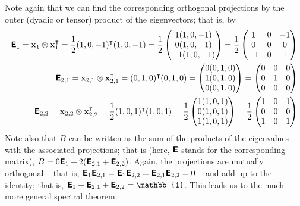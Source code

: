 {Note again that we can find the corresponding orthogonal projections by the outer (dyadic or tensor) product
of the eigenvectors; that is,  by
\begin{equation}
\begin{split}
\textsf{\textbf{E}}_1 =
{\bf x}_1 \otimes {\bf x}_1^\intercal  =
\frac{1}{2} (1,0,-1)^\intercal (1,0,-1) =
\frac{1}{2}
\begin{pmatrix}
1(1,0,-1)\\
0(1,0,-1)\\
-1(1,0,-1)
\end{pmatrix} =
\frac{1}{2}
\begin{pmatrix}
1&0&-1\\
0&0&0\\
-1&0&1
\end{pmatrix}
\\
\textsf{\textbf{E}}_{2,1} =
{\bf x}_{2,1} \otimes {\bf x}_{2,1}^\intercal  =
(0,1,0)^\intercal (0,1,0) =
\begin{pmatrix}
0(0,1,0)\\
1(0,1,0)\\
0(0,1,0)
\end{pmatrix} =
\begin{pmatrix}
0&0&0\\
0&1&0\\
0&0&0
\end{pmatrix}
\\
\textsf{\textbf{E}}_{2,2} =
{\bf x}_{2,2} \otimes {\bf x}_{2,2}^\intercal  =
\frac{1}{2} (1,0,1)^\intercal (1,0,1) =
\frac{1}{2}
\begin{pmatrix}
1(1,0,1)\\
0(1,0,1)\\
1(1,0,1)
\end{pmatrix} =
\frac{1}{2}
\begin{pmatrix}
1&0&1\\
0&0&0\\
1&0&1
\end{pmatrix}
\end{split}
\end{equation}
Note also that $B$ can be written as the sum of the products of the
eigenvalues with the associated projections; that is (here, $\textsf{\textbf{E}}$
stands for the corresponding matrix),
$B= 0  \textsf{\textbf{E}}_1 + 2 (\textsf{\textbf{E}}_{2,1} + \textsf{\textbf{E}}_{2,2} )$.
Again, the projections are mutually orthogonal
-- that is,
$\textsf{\textbf{E}}_1 \textsf{\textbf{E}}_{2,1} = \textsf{\textbf{E}}_1\textsf{\textbf{E}}_{2,2}=
\textsf{\textbf{E}}_{2,1}\textsf{\textbf{E}}_{2,2}=0$
--
and add up to the identity; that is,
$\textsf{\textbf{E}}_1+\textsf{\textbf{E}}_{2,1}+\textsf{\textbf{E}}_{2,2}=\mathbb{1}$.
This leads us to the much more general spectral theorem.

}
